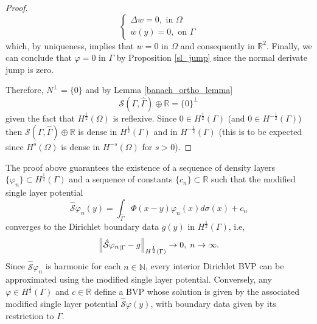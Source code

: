 \begin{proof}
    \[
        \begin{cases}
            \Delta w = 0, \text{ in } \Omega\\
            w(y) = 0, \text{ on } \Gamma
        \end{cases}
    \]
    which, by uniqueness, implies that \(w = 0\) in \(\Omega\) and consequently in \(\mathbb{R}^2\). Finally, we can conclude that \(\varphi = 0\) in \(\Gamma\) by Proposition \ref{sl_jump} since the normal derivate jump is zero.

    Therefore, \(N^\perp = \{0\}\) and by Lemma \ref{banach_ortho_lemma}
    \[
        \mathcal{S}(\Gamma, \hat{\Gamma}) \oplus \mathbb{R} = \{0\}^\perp
    \]
    given the fact that \(H^\frac{1}{2}(\Omega)\) is reflexive. Since \(0 \in H^\frac{1}{2}(\Gamma)\) (and \(0 \in H^{-\frac{1}{2}}(\Gamma)\)) then \(\mathcal{S}(\Gamma, \hat{\Gamma}) \oplus \mathbb{R}\) is dense in \(H^\frac{1}{2}(\Gamma)\) and in \(H^{-\frac{1}{2}}(\Gamma)\) (this is to be expected since \(H^{s}(\Omega)\) is dense in \(H^{-s}(\Omega)\) for \(s > 0\)).
\end{proof}
\begin{remark}\label{remark_density_sequence_density_layers}
    The proof above guarantees the existence of a sequence of density layers \(\{\varphi_n\} \subset H^{\frac{1}{2}}(\Gamma)\) and a sequence of constants \(\{c_n\} \subset \mathbb{R}\) such that the modified single layer potential
    \[
        \hat{\mathcal{S}}\varphi_n(y) = \int_{\hat{\Gamma}} \Phi(x-y)\varphi_n(x) d\sigma(x) + c_n
    \]
    converges to the Dirichlet boundary data \(g(y)\) in \(H^\frac{1}{2}(\Gamma)\), i.e,
    \[
        \norm{{\hat{\mathcal{S}}\varphi_n}_{|\Gamma} - g}_{H^\frac{1}{2}(\Gamma)} \rightarrow 0, \; n \rightarrow \infty.
    \]
    Since \(\hat{\mathcal{S}}\varphi_n\) is harmonic for each \(n \in \mathbb{N}\), every interior Dirichlet \ac{BVP} can be approximated using the modified single layer potential. Conversely, any \(\varphi \in H^\frac{1}{2}(\Gamma)\) and \(c \in \mathbb{R}\) define a \ac{BVP} whose solution is given by the associated modified single layer potential \(\hat{\mathcal{S}}\varphi(y)\), with boundary data given by its restriction to \(\Gamma\).
\end{remark}

